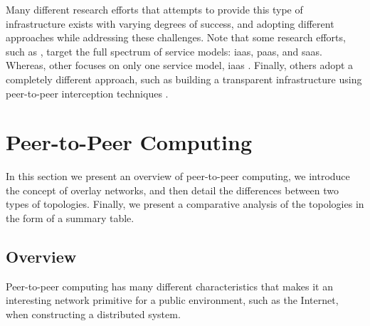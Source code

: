 \documentclass[12pt, titlepage]{uo_temp}
\begin{document}
     Many different research efforts that attempts to provide this type of infrastructure
     exists with varying degrees of success, and adopting different approaches while
     addressing these challenges. Note that some research efforts, such as
     \cite{cunsolo2010open}, target the full spectrum of service models: \gls{iaas},
     \gls{paas}, and \gls{saas}. Whereas, other focuses on only one service model,
     \gls{iaas} \cite{P2PCS} \cite{chandra2009nebulas}.  Finally, others adopt a
     completely different approach, such as building a transparent infrastructure using
     peer-to-peer interception techniques \cite{mondejar2013cloudsnap}.

     \section{Peer-to-Peer Computing}
     In this section we present an overview of peer-to-peer computing, we
     introduce the concept of overlay networks, and then detail the differences between
     two types of topologies. Finally, we present a comparative analysis of the topologies
     in the form of a summary table.

     \subsection{Overview}
     Peer-to-peer computing has many different characteristics that makes it an
     interesting network primitive for a public environment, such as the Internet, when
     constructing a distributed system.
\end{document}
